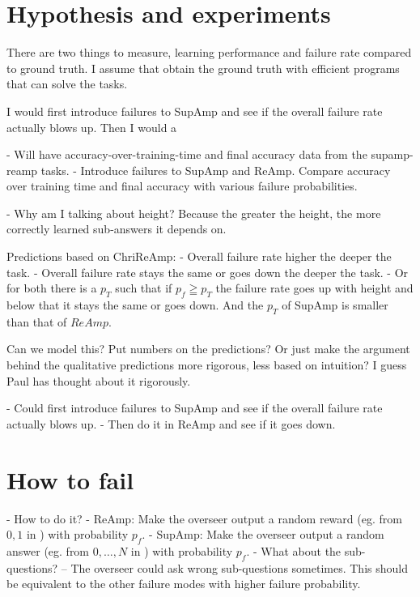 \documentclass{farlamp}
\begin{document}
\section{Hypothesis and experiments}

There are two things to measure, learning performance and failure rate compared
to ground truth. I assume that \textcite{CSASupAmp} obtain the ground truth with
efficient programs that can solve the tasks.

I would first introduce failures to SupAmp and see if the overall failure rate
actually blows up. Then I would a

- Will have accuracy-over-training-time and final accuracy data from the
supamp-reamp tasks.
- Introduce failures to SupAmp and ReAmp. Compare accuracy over training time
and final accuracy with various failure probabilities.

- Why am I talking about height? Because the greater the height, the more
correctly learned sub-answers it depends on.

Predictions based on ChriReAmp:
- Overall failure rate higher the deeper the task.
- Overall failure rate stays the same or goes down the deeper the task.
- Or for both there is a $p_T$ such that if $p_f \geqq p_T$ the failure rate
goes up with height and below that it stays the same or goes down. And the $p_T$
of SupAmp is smaller than that of $ReAmp$.

\OQ Can we model this? Put numbers on the predictions? Or just make the
argument behind the qualitative predictions more rigorous, less based on
intuition? I guess Paul has thought about it rigorously.

- Could first introduce failures to SupAmp and see if the overall failure rate
actually blows up.
- Then do it in ReAmp and see if it goes down.


\section{How to fail}

- How to do it?
    - ReAmp: Make the overseer output a random reward (eg. from ${0,
    1}$ in ) with probability $p_f$.
    - SupAmp: Make the overseer output a random answer (eg. from ${0, …,
    N}$ in ) with probability $p_f$.
    - What about the sub-questions? – The overseer could ask wrong sub-questions
    sometimes. This should be equivalent to the other failure modes with higher
    failure probability.
\end{document}

